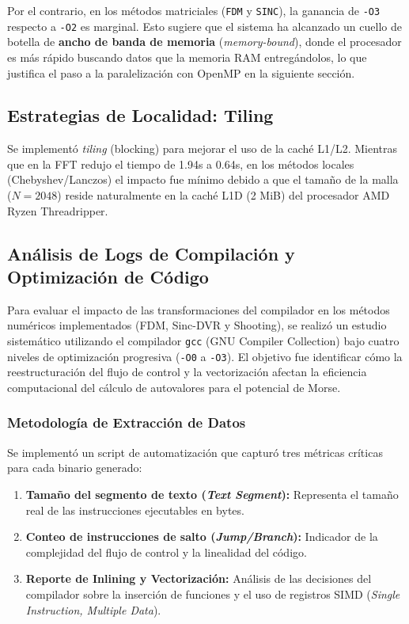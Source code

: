 \documentclass[11pt,fleqn]{article}
\begin{document}
Por el contrario, en los métodos matriciales (\texttt{FDM} y \texttt{SINC}), la ganancia de \texttt{-O3} respecto a \texttt{-O2} es marginal. Esto sugiere que el sistema ha alcanzado un cuello de botella de \textbf{ancho de banda de memoria} (\textit{memory-bound}), donde el procesador es más rápido buscando datos que la memoria RAM entregándolos, lo que justifica el paso a la paralelización con OpenMP en la siguiente sección.
\subsection{Estrategias de Localidad: Tiling}
Se implementó \textit{tiling} (blocking) para mejorar el uso de la caché L1/L2. Mientras que en la FFT redujo el tiempo de 1.94s a 0.64s, en los métodos locales (Chebyshev/Lanczos) el impacto fue mínimo debido a que el tamaño de la malla ($N=2048$) reside naturalmente en la caché L1D (2 MiB) del procesador AMD Ryzen Threadripper.

\subsection{Análisis de Logs de Compilación y Optimización de Código}

Para evaluar el impacto de las transformaciones del compilador en los métodos numéricos implementados (FDM, Sinc-DVR y Shooting), se realizó un estudio sistemático utilizando el compilador \texttt{gcc} (GNU Compiler Collection) bajo cuatro niveles de optimización progresiva (\texttt{-O0} a \texttt{-O3}). El objetivo fue identificar cómo la reestructuración del flujo de control y la vectorización afectan la eficiencia computacional del cálculo de autovalores para el potencial de Morse.

\subsubsection{Metodología de Extracción de Datos}

Se implementó un script de automatización que capturó tres métricas críticas para cada binario generado:
\begin{enumerate}
    \item \textbf{Tamaño del segmento de texto (\textit{Text Segment}):} Representa el tamaño real de las instrucciones ejecutables en bytes.
    \item \textbf{Conteo de instrucciones de salto (\textit{Jump/Branch}):} Indicador de la complejidad del flujo de control y la linealidad del código.
    \item \textbf{Reporte de Inlining y Vectorización:} Análisis de las decisiones del compilador sobre la inserción de funciones y el uso de registros SIMD (\textit{Single Instruction, Multiple Data}).
\end{enumerate}
\end{document}
